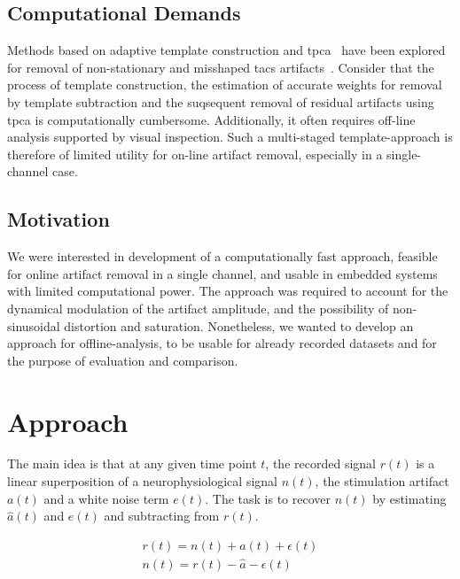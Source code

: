 \documentclass[a4paper]{article}
\begin{document}
\subsection{Computational Demands}

Methods based on adaptive template construction and \gls{tpca}~\citep{Niazy_2005} have been explored for removal of  non-stationary and misshaped \gls{tacs} artifacts~\citep{Helfrich_2014}.
Consider that the process of template construction, the estimation of accurate weights for removal by template subtraction and the suqsequent removal of residual artifacts using \gls{tpca} is computationally cumbersome. Additionally, it often requires off-line analysis supported by visual inspection.
Such a multi-staged template-approach is therefore of limited utility for on-line artifact removal, especially in a single-channel case.

\subsection{Motivation}

We were interested in development of a computationally fast approach, feasible for online artifact removal in a single channel, and usable in embedded systems with limited computational power.
The approach was required to account for the dynamical modulation of the artifact amplitude, and the possibility of non-sinusoidal distortion and saturation.
Nonetheless, we wanted to develop an approach for offline-analysis, to be usable for already recorded datasets and for the purpose of evaluation and comparison.

\section{Approach}

The main idea is that at any given time point $t$, the recorded signal $r(t)$ is a linear super\-position of a neurophysiological signal $n(t)$, the stimulation artifact $a(t)$ and a white noise term $e(t)$. The task is to recover $n(t)$ by estimating $\hat{a}(t)$ and $e(t)$ and subtracting from $r(t)$.

\begin{eqnarray}
    r(t) = n(t) + a(t) + \epsilon(t)\\
    n(t) = r(t) - \hat{a} - \epsilon(t)
\end{eqnarray}
\end{document}
